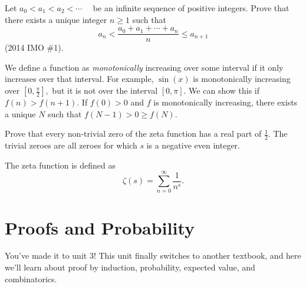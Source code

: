 \documentclass[11pt]{article}
\begin{document}
\begin{problem}[HM45]
    Let $a_0<a_1<a_2<\cdots \quad$ be an infinite sequence of positive integers. Prove that there exists a unique integer $n\ge1$ such that
    \[a_n<\frac{a_0+a_1+\cdots + a_n}{n}\le a_{n+1}\]
    (2014 IMO \#1).
    \begin{hint}
        We define a function as \textit{monotonically} increasing over some interval if it only increases over that interval. For example, $\sin(x)$ is monotonically increasing over $[0,\frac{\pi}{2}],$ but it is not over the interval $[0, \pi]$. We can show this if $f(n) > f(n+1)$. If $f(0) > 0$ and $f$ is monotonically increasing, there exists a unique $N$ such that $f(N-1) > 0 \geq f(N)$.
    \end{hint}
\end{problem}
\begin{problem}[HM50]
    Prove that every non-trivial zero of the zeta function has a real part of $\frac{1}{2}$. The trivial zeroes are all zeroes for which $s$ is a negative even integer.
    \begin{remark}
        The zeta function is defined as
        \[\zeta(s) = \sum_{n=0}^{\infty} \frac{1}{n^s}.\]
    \end{remark}
\end{problem}

\newpage

\section{Proofs and Probability}
You've made it to unit 3! This unit finally switches to another textbook, and here we'll learn about proof by induction, probability, expected value, and combinatorics.
\end{document}
